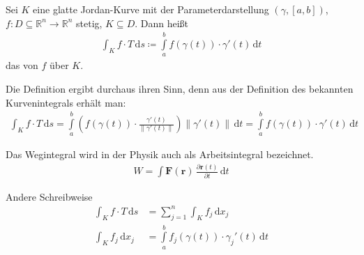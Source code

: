 \documentclass[a4paper,10pt]{scrbook}
\begin{document}
\begin{theorem}[Definition]
  Sei $K$ eine glatte Jordan-Kurve mit der Parameterdarstellung $(\gamma,[a,b])$, $f : D \subseteq \mathbb{R}^n \to \mathbb{R}^n$ stetig, $K \subseteq D$. Dann heißt
  \begin{align*}
    \int_K f \cdot T \, \mathrm{d}s \coloneq \int\limits_{a}^{b} f(\gamma(t)) \cdot \gamma'(t) \, \mathrm{d}t
  \end{align*}
  das  von $f$ über $K$.
\end{theorem}

\begin{notice}
  \begin{enum-arab}
    \item Die Definition ergibt durchaus ihren Sinn, denn aus der Definition des bekannten Kurvenintegrals erhält man:
    \begin{align*}
      \int_K f \cdot T \, \mathrm{d}s = \int\limits_{a}^{b} \left( f(\gamma(t)) \cdot \frac{\gamma'(t)}{\|\gamma'(t)\|} \right) \|\gamma'(t)\| \, \mathrm{d}t = \int\limits_{a}^{b} f(\gamma(t)) \cdot \gamma'(t) \, \mathrm{d}t
    \end{align*}

    \item Das Wegintegral wird in der Physik auch als Arbeitsintegral bezeichnet.
    \begin{align*}
      W = \int \bm{F}(\bm{r}) \, \frac{\partial \bm{r}(t)}{\partial t} \, \mathrm{d}t
    \end{align*}

    \item Andere Schreibweise
    \begin{align*}
      \int_K f \cdot T \, \mathrm{d}s &= \sum\limits_{j=1}^{n} \int_K f_j \, \mathrm{d}x_j \\
      \int_K f_j \, \mathrm{d}x_j &= \int\limits_{a}^{b} f_j(\gamma(t)) \cdot \gamma_j'(t) \, \mathrm{d}t
    \end{align*}
  \end{enum-arab}
\end{notice}
\end{document}
